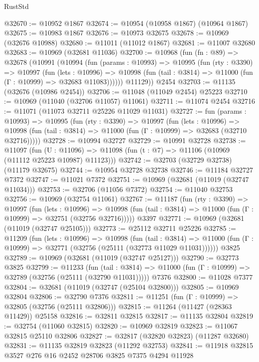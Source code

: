 \begin{lexlean}{RustStd}
\begin{coremodule}
@32670 := @10952 @1867
@32674 := @10954 (@10958 @1867) (@10964 @1867)
@32675 := @10983 @1867
@32676 := @10973 @32675
@32678 := @10969 (@32676 @10988)
@32680 := @11011 (@11012 @1867)
@32681 := @11007 @32680
@32683 := @10969 (@32681 @11036)
@32700 := @10968
    (fun (fn : @89) =>
    @32678
      (@10991
        (@10994
          (fun (params : @10993) =>
          @10995
            (fun (rty : @3390) =>
            @10997
              (fun (lets : @10996) =>
              @10998 (fun (tail : @3814) => @11000 (fun (Γ : @10999) => @32683 @11083))))))
        @11129))
    @2454
@32703 := @11135 (@32676 (@10986 @2454))
@32706 := @11048 (@11049 @2454) @25223
@32710 := @10969 (@11040 (@32706 @11057) @11061)
@32711 := @11074 @2454
@32716 := @11071 (@11073 @32711 @25226 @11029 @11031)
@32727 := fun (params : @10993) =>
  @10995
    (fun (rty : @3390) =>
    @10997
      (fun (lets : @10996) =>
      @10998 (fun (tail : @3814) => @11000 (fun (Γ : @10999) => @32683 (@32710 @32716)))))
@32728 := @10994 @32727
@32729 := @10991 @32728
@32738 := @11097
    (fun (U : @11096) => @11098 (fun (t : @7) => @11106 (@10969 (@11112 @25223 @10987) @11123)))
@32742 := @32703 (@32729 @32738) (@11179 @32675)
@32744 := @10954 @32728 @32738
@32746 := @11184 @32727 @7372
@32747 := @11021 @7372
@32751 := @10969 (@32681 (@11019 (@32747 @11034)))
@32753 := @32706 (@11056 @7372)
@32754 := @11040 @32753
@32756 := @10969 (@32754 @11061)
@32767 := @11187
    (fun (rty : @3390) =>
    @10997
      (fun (lets : @10996) =>
      @10998 (fun (tail : @3814) => @11000 (fun (Γ : @10999) => @32751 (@32756 @32716)))))
    @3397
@32771 := @10969 (@32681 (@11019 (@32747 @25105)))
@32773 := @25112 @32711 @25226
@32785 := @11209
    (fun (lets : @10996) =>
    @10998
      (fun (tail : @3814) =>
      @11000 (fun (Γ : @10999) => @32771 (@32756 (@25111 (@32773 @11029 @11031))))))
    @3825
@32789 := @10969 (@32681 (@11019 (@32747 @25127)))
@32790 := @32773 @3825
@32799 := @11233
    (fun (tail : @3814) => @11000 (fun (Γ : @10999) => @32789 (@32756 (@25111 (@32790 @11031)))))
    @7376
@32800 := @11028 @7377
@32804 := @32681 (@11019 (@32747 (@25104 @32800)))
@32805 := @10969 @32804
@32806 := @32790 @7376
@32811 := @11251 (fun (Γ : @10999) => @32805 (@32756 (@25111 @32806)))
@32815 := @11264 (@11427 (@28363 @11429)) @25158
@32816 := @32811 @32815
@32817 := @11135 @32804
@32819 := @32754 (@11060 @32815)
@32820 := @10969 @32819
@32823 := @11067 @32815 @25110 @32806
@32827 := @32817 (@32820 @32823) (@11287 @32680)
@32831 := @11135 @32819 @32823 (@11292 @32753)
@32841 := @11918 @32815 @3527 @276 @16 @2452 @28706 @3825 @7375 @4294 @11928

\end{coremodule}
\end{lexlean}
